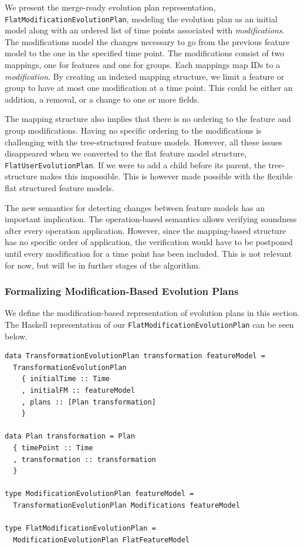 \documentclass[a4paper,english]{ifimaster}
\begin{document}
We present the merge-ready evolution plan representation, \texttt{Flat\-Modification\-Evolution\-Plan}, modeling the evolution plan as an initial model along with an ordered list of time points associated with \textit{modifications}. The modifications model the changes necessary to go from the previous feature model to the one in the specified time point. The modifications consist of two mappings, one for features and one for groups. Each mappings map IDs to a \textit{modification}. By creating an indexed mapping structure, we limit a feature or group to have at most one modification at a time point. This could be either an addition, a removal, or a change to one or more fields. 

The mapping structure also implies that there is no ordering to the feature and group modifications. Having no specific ordering to the modifications is challenging with the tree-structured feature models. However, all these issues disappeared when we converted to the flat feature model structure, \texttt{Flat\-User\-Evolution\-Plan}. If we were to add a child before its parent, the tree-structure makes this impossible. This is however made possible with the flexible flat structured feature models.

The new semantics for detecting changes between feature models has an important implication. The operation-based semantics allows verifying soundness after every operation application. However, since the mapping-based structure has no specific order of application, the verification would have to be postponed until every modification for a time point has been included. This is not relevant for now, but will be in further stages of the algorithm.

\subsubsection{Formalizing Modification-Based Evolution Plans}%
\label{ssub:formalizing_modification_based_evolution_plans}

We define the modification-based representation of evolution plans in this section. The Haskell representation of our \texttt{Flat\-Modification\-Evolution\-Plan} can be seen below.

\begin{verbatim}
data TransformationEvolutionPlan transformation featureModel = 
  TransformationEvolutionPlan
    { initialTime :: Time
    , initialFM :: featureModel
    , plans :: [Plan transformation]
    }

data Plan transformation = Plan
  { timePoint :: Time
  , transformation :: transformation
  }

type ModificationEvolutionPlan featureModel = 
  TransformationEvolutionPlan Modifications featureModel

type FlatModificationEvolutionPlan = 
  ModificationEvolutionPlan FlatFeatureModel
\end{verbatim}
\end{document}
